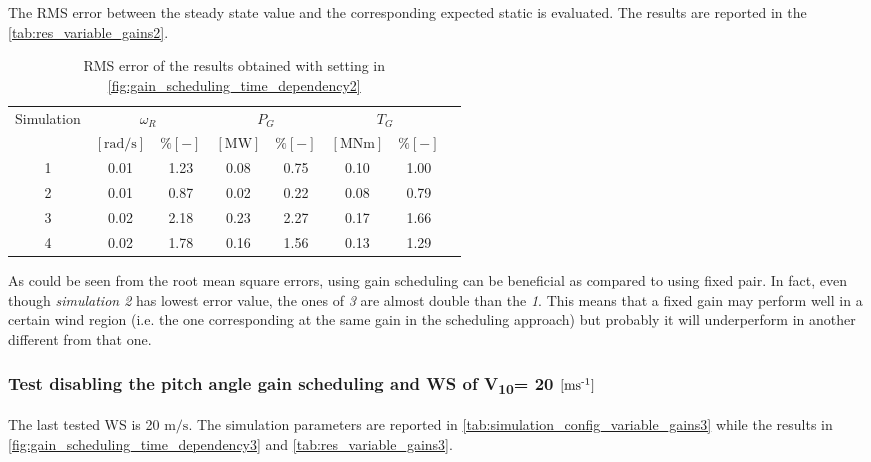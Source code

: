 The \acrshort{RMS} error between the steady state value and the corresponding expected static is evaluated. The results are reported in the \autoref{tab:res_variable_gains2}.
\begin{table}[htb]
  \caption{RMS error of the results obtained with setting in \autoref{fig:gain_scheduling_time_dependency2}}
  \centering
  \begin{tabular}{cccccccc}
    \toprule
      Simulation & \multicolumn{2}{c}{$\omega_R$} & \multicolumn{2}{c}{$P_G$} & \multicolumn{2}{c}{$T_G$} \\ 
       & $\left[\si{\radian\per\second}\right]$ & $ \% \left[-\right]$ & $\left[\si{\mega\watt}\right]$ & $ \% \left[-\right]$ & $\left[\si{\mega\newton\meter} \right]$ & $ \% \left[-\right]$ \\ \midrule      
     1 & 0.01 &  1.23 &  0.08  &  0.75  &  0.10  &  1.00 \\
     2 & 0.01 &  0.87 &  0.02  &  0.22  &  0.08  &  0.79 \\
     3 & 0.02 &  2.18 &  0.23  &  2.27  &  0.17  &  1.66 \\
     4 & 0.02 &  1.78 &  0.16  &  1.56  &  0.13  &  1.29 \\
    
     \bottomrule
  \end{tabular}
  \label{tab:res_variable_gains2}
\end{table}

As could be seen from the root mean square errors, using gain scheduling can be beneficial as compared to using fixed pair. In fact, even though \textit{simulation 2} has lowest error value, the ones of \textit{3} are almost double than the \textit{1}. This means that a fixed gain may perform well in a certain wind region (i.e. the one corresponding at the same gain in the scheduling approach) but probably it will underperform in another different from that one.  

\subsubsection[$V_{10}=20 \, \si{\meter\per\second}$]{Test disabling the pitch angle gain scheduling and WS of V\textsubscript{10}= 20 $\left[ \text{ms}\textsuperscript{-1} \right]$}
The last tested \acrshort{WS} is 20 $\si{\meter\per\second}$. The simulation parameters are reported in \autoref{tab:simulation_config_variable_gains3} while the results in \autoref{fig:gain_scheduling_time_dependency3} and \autoref{tab:res_variable_gains3}.

